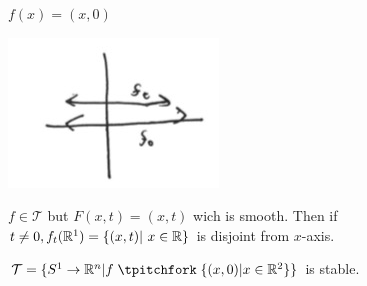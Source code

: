 \begin{example}
  $f(x)=(x,0)$
  \begin{center}
    \includegraphics[width=0.30\paperwidth]{difftop/week06/stableEx2}
  \end{center}
  $f \in \mathcal{T}$ but $F(x,t)=(x,t)$ wich is smooth. Then if $t\neq 0, f_t(\R^1)= \{(x,t) | x\in \R \}$ is disjoint from $x$-axis.
\end{example}

\begin{example}
  $\mathcal{ T} = \{ S^1 \to \R^n | f \transv \{(x,0)| x\in \R^2 \} \}$ is stable.
\end{example}

